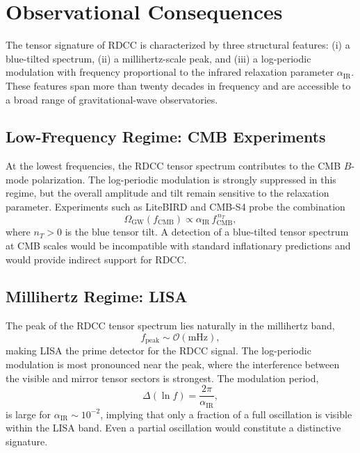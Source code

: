 \documentclass[11pt,a4paper]{article}
\begin{document}
\section{Observational Consequences}

The tensor signature of RDCC is characterized by three structural features:
(i) a blue-tilted spectrum, (ii) a millihertz-scale peak, and (iii) a log-periodic
modulation with frequency proportional to the infrared relaxation parameter
$\alpha_{\mathrm{IR}}$. These features span more than twenty decades in frequency and
are accessible to a broad range of gravitational-wave observatories.

\subsection{Low-Frequency Regime: CMB Experiments}

At the lowest frequencies, the RDCC tensor spectrum contributes to the CMB
$B$-mode polarization. The log-periodic modulation is strongly suppressed in this
regime, but the overall amplitude and tilt remain sensitive to the relaxation
parameter. Experiments such as LiteBIRD and CMB-S4 probe the combination
\begin{equation}
    \Omega_{\mathrm{GW}}(f_{\mathrm{CMB}})
    \propto \alpha_{\mathrm{IR}}\, f_{\mathrm{CMB}}^{\,n_{T}},
\end{equation}
where $n_{T} > 0$ is the blue tensor tilt. A detection of a blue-tilted tensor
spectrum at CMB scales would be incompatible with standard inflationary
predictions and would provide indirect support for RDCC.

\subsection{Millihertz Regime: LISA}

The peak of the RDCC tensor spectrum lies naturally in the millihertz band,
\begin{equation}
    f_{\mathrm{peak}} \sim \mathcal{O}(\mathrm{mHz}),
\end{equation}
making LISA the prime detector for the RDCC signal. The log-periodic modulation
is most pronounced near the peak, where the interference between the visible and
mirror tensor sectors is strongest. The modulation period,
\begin{equation}
    \Delta(\ln f)
    = \frac{2\pi}{\alpha_{\mathrm{IR}}},
\end{equation}
is large for $\alpha_{\mathrm{IR}} \sim 10^{-2}$, implying that only a fraction of a full
oscillation is visible within the LISA band. Even a partial oscillation would
constitute a distinctive signature.
\end{document}
